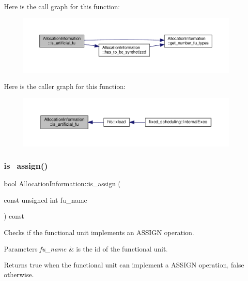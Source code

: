 Here is the call graph for this function\+:
\nopagebreak
\begin{figure}[H]
\begin{center}
\leavevmode
\includegraphics[width=350pt]{d7/d79/classAllocationInformation_af4a69fd5612c7c12cd0fa2b55d18d9c5_cgraph}
\end{center}
\end{figure}
Here is the caller graph for this function\+:
\nopagebreak
\begin{figure}[H]
\begin{center}
\leavevmode
\includegraphics[width=350pt]{d7/d79/classAllocationInformation_af4a69fd5612c7c12cd0fa2b55d18d9c5_icgraph}
\end{center}
\end{figure}
\mbox{\label{classAllocationInformation_a2989fe891888c7cbf2827061e22143dc}} 
\subsubsection{\texorpdfstring{is\+\_\+assign()}{is\_assign()}}
{\footnotesize\ttfamily bool Allocation\+Information\+::is\+\_\+assign (\begin{DoxyParamCaption}\item[{const unsigned int}]{fu\+\_\+name }\end{DoxyParamCaption}) const}



Checks if the functional unit implements an A\+S\+S\+I\+GN operation. 


\begin{DoxyParams}{Parameters}
{\em fu\+\_\+name} & is the id of the functional unit. \\
\hline
\end{DoxyParams}
\begin{DoxyReturn}{Returns}
true when the functional unit can implement a A\+S\+S\+I\+GN operation, false otherwise. 
\end{DoxyReturn}


